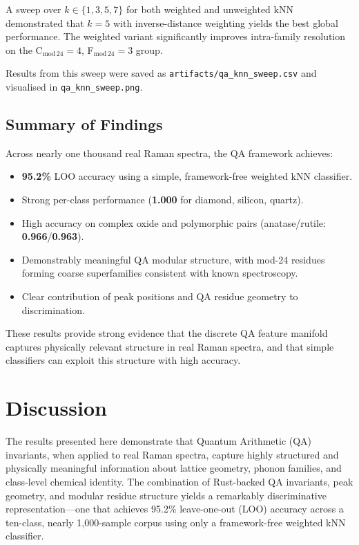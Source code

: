 \documentclass[12pt]{article}
\begin{document}
A sweep over $k\in\{1,3,5,7\}$ for both weighted and unweighted kNN
demonstrated that $k=5$ with inverse-distance weighting yields the best global
performance. The weighted variant significantly improves intra-family resolution
on the C$_{\mathrm{mod}\,24}=4$, F$_{\mathrm{mod}\,24}=3$ group.

Results from this sweep were saved as
\texttt{artifacts/qa\_knn\_sweep.csv} and visualised in
\texttt{qa\_knn\_sweep.png}.

\subsection{Summary of Findings}

Across nearly one thousand real Raman spectra, the QA framework achieves:

\begin{itemize}
    \item \textbf{95.2\%} LOO accuracy using a simple, framework-free weighted kNN classifier.
    \item Strong per-class performance (\textbf{1.000} for diamond, silicon, quartz).
    \item High accuracy on complex oxide and polymorphic pairs 
          (anatase/rutile: \textbf{0.966}/\textbf{0.963}).
    \item Demonstrably meaningful QA modular structure, with mod-24 residues forming
          coarse superfamilies consistent with known spectroscopy.
    \item Clear contribution of peak positions and QA residue geometry to discrimination.
\end{itemize}

These results provide strong evidence that the discrete QA feature
manifold captures physically relevant structure in real Raman spectra,
and that simple classifiers can exploit this structure with high accuracy.

\section{Discussion}
\label{sec:discussion}

The results presented here demonstrate that Quantum Arithmetic (QA) invariants, when applied to real Raman
spectra, capture highly structured and physically meaningful information about lattice geometry,
phonon families, and class-level chemical identity. The combination of Rust-backed QA invariants, 
peak geometry, and modular residue structure yields a remarkably discriminative representation—one that 
achieves 95.2\% leave-one-out (LOO) accuracy across a ten-class, nearly 1,000-sample corpus using only a 
framework-free weighted kNN classifier.
\end{document}
